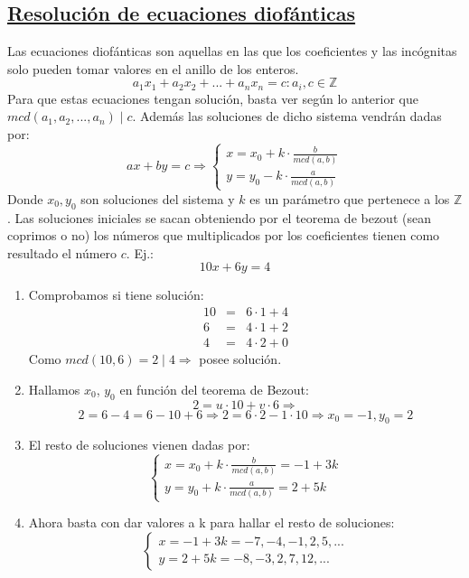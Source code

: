 \documentclass[10pt,a4paper,openright]{book}
\begin{document}
\subsection*{\underline{Resolución de ecuaciones diofánticas}}
Las ecuaciones diofánticas son aquellas en las que los coeficientes y las incógnitas solo pueden tomar valores en el anillo de los enteros.
$$a_1x_1+a_2x_2+...+a_nx_n=c : a_i, c\in \mathbb Z$$
Para que estas ecuaciones tengan solución, basta ver según lo anterior que $mcd(a_1,a_2,...,a_n)\mid c$.
Además las soluciones de dicho sistema vendrán dadas por:
$$
ax+by=c\Rightarrow
\begin{cases}
x=x_0+k\cdot\frac{b}{mcd(a,b)} \\
y=y_0-k\cdot \frac{a}{mcd(a,b)} 
\end{cases}
$$
Donde $x_0, y_0$ son soluciones del sistema y $k$ es un parámetro que pertenece a los $\mathbb Z$.
Las soluciones iniciales se sacan obteniendo por el teorema de bezout (sean coprimos o no) los números que multiplicados por los coeficientes tienen como resultado el número $c$.
Ej.:
$$10x+6y=4$$
\begin{enumerate}
\item Comprobamos si tiene solución:
\begin{eqnarray}
10 &=& 6\cdot 1 +4 \\
6  &=& 4\cdot 1 + 2 \\
4  &=& 4\cdot 2 + 0
\end{eqnarray}
Como $mcd(10,6)=2\mid 4 \Rightarrow$ posee solución.

\item Hallamos $x_0$, $y_0$ en función del teorema de Bezout:
$$2=u\cdot 10 + v\cdot 6\Rightarrow$$
$$2=6-4=6-10+6\Rightarrow 2=6\cdot 2 -1\cdot 10\Rightarrow x_0=-1,y_0=2$$

\item El resto de soluciones vienen dadas por:
$$
\begin{cases}
x=x_0+k\cdot\frac{b}{mcd(a,b)}=-1+3k \\
y=y_0+k\cdot \frac{a}{mcd(a,b)}=2+5k
\end{cases}
$$

\item Ahora basta con dar valores a k para hallar el resto de soluciones:
$$
\begin{cases}
x=-1+3k=-7,-4,-1,2, 5,... \\
y=2+5k=-8,-3, 2, 7, 12, ...
\end{cases}
$$
\end{enumerate}
\end{document}
